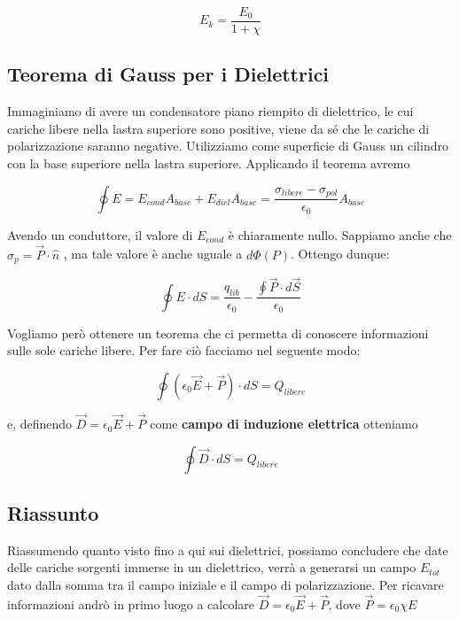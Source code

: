 $$ E_k = \frac{E_0}{1 + \chi} $$ 

\subsection{Teorema di Gauss per i Dielettrici}

Immaginiamo di avere un condensatore piano riempito di dielettrico, le cui cariche libere nella lastra superiore sono positive, viene da sé che le cariche di polarizzazione saranno negative. Utilizziamo come superficie di Gauss un cilindro con la base superiore nella lastra superiore. Applicando il teorema avremo

$$
\oint E = E_{cond}A_{base}  + E_{diel}A_{base} = \frac{\sigma_{libere}  - \sigma_{pol}}{\epsilon_0} A_{base}
$$

Avendo un conduttore, il valore di $E_{cond}$ è chiaramente nullo. Sappiamo anche che $\sigma_p = \vec{P} \cdot \hat{n}$ , ma tale valore è anche uguale a $d\Phi(P)$. Ottengo dunque: 

$$
\oint E \cdot dS = 	\frac{q_{lib}}{\epsilon_0} - \frac{ \oint \vec{P} \cdot d\vec{S}}{\epsilon_0}
$$

Vogliamo però ottenere un teorema che ci permetta di conoscere informazioni sulle sole cariche libere. Per fare ciò facciamo nel seguente modo: 

$$
\oint  \left(\epsilon_0 \vec{E} + \vec{P} \right) \cdot dS = Q_{libere}
$$

e, definendo $\vec{D} = \epsilon_0\vec{E}+ \vec{P}$ come \textbf{campo di induzione elettrica} otteniamo

\begin{tcolorbox}[colframe=red, colback=red!10, title=Teorema di Gauss nei Dielettrici]
	\begin{large}
		\begin{equation}
			\oint \vec{D} \cdot dS = Q_{libere}
		\end{equation}
	\end{large}
\end{tcolorbox}

\subsection{Riassunto}
Riassumendo quanto visto fino a qui sui dielettrici, possiamo concludere che date delle cariche sorgenti immerse in un dielettrico, verrà a generarsi un campo $E_{tot}$ dato dalla somma tra il campo iniziale e il campo di polarizzazione. Per ricavare informazioni andrò in primo luogo a calcolare $\vec{D} = \epsilon_0\vec{E} + \vec{P}$, dove $\vec{P} = \epsilon_0 \chi E$ 

